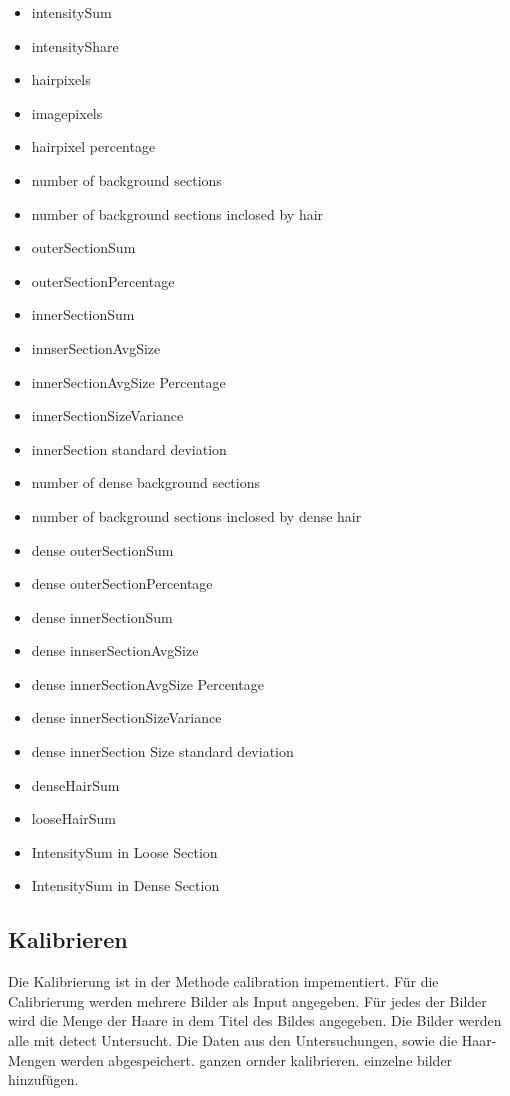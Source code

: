 \documentclass[german,a4paper,12pt]{llncs}
\begin{document}
\begin{itemize}
	\item intensitySum 
	\item intensityShare
	\item hairpixels
	\item imagepixels
	\item hairpixel percentage
	\item number of background sections
	\item number of background sections inclosed by hair
	\item outerSectionSum
	\item outerSectionPercentage
	\item innerSectionSum
	\item innserSectionAvgSize
	\item innerSectionAvgSize Percentage
	\item innerSectionSizeVariance
	\item innerSection standard deviation
	\item number of dense background sections
	\item number of background sections inclosed by dense hair
	\item dense outerSectionSum
	\item dense outerSectionPercentage
	\item dense innerSectionSum
	\item dense innserSectionAvgSize
	\item dense innerSectionAvgSize Percentage
	\item dense innerSectionSizeVariance
	\item dense innerSection Size standard deviation
	\item denseHairSum
	\item looseHairSum
	\item IntensitySum in Loose Section
	\item IntensitySum in Dense Section
\end{itemize}

\subsection{Kalibrieren}

Die Kalibrierung ist in der Methode calibration impementiert.
Für die Calibrierung werden mehrere Bilder als Input angegeben. Für jedes der Bilder wird die Menge der Haare in dem Titel des Bildes angegeben. 
Die Bilder werden alle mit detect Untersucht. Die Daten aus den Untersuchungen, sowie die Haar-Mengen werden abgespeichert.
ganzen ornder kalibrieren. einzelne bilder hinzufügen.
\end{document}
